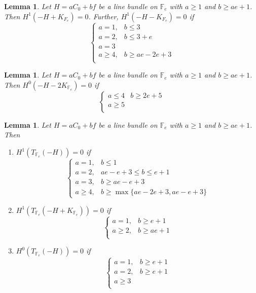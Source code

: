 \documentclass[11pt,twoside]{amsart}
\theoremstyle{plain}
\numberwithin{equation}{section}
\newtheorem{lemma}[theorem]{Lemma}
\theoremstyle{definition}
\begin{document}
\begin{lemma}\label{-H-K_Y}
Let $H = aC_0+bf$ be a line bundle on $\mathbb{F}_e$ with $a \geq 1$ and $b \geq ae+1$. Then $H^1(-H+K_{F_e}) = 0$. Further, $H^1(-H-K_{F_e}) = 0$ if 
 \[
\begin{cases}
   a = 1, & b \leq 3  \\
   a = 2, & b \leq 3+e \\
   a = 3 & \\
   a \geq 4, & b \geq ae-2e+3 \\
\end{cases}
 \]

\end{lemma}



\begin{lemma}\label{-H-2K_Y}
Let $H = aC_0+bf$ be a line bundle on $\mathbb{F}_e$ with $a \geq 1$ and $b \geq ae+1$. Then $H^0(-H-2K_{\mathbb{F}_e}) = 0$ if 
\[
\begin{cases}
   a \leq 4 & b \geq 2e+5  \\
   a \geq 5 &   \\
   
\end{cases}
\]
    
\end{lemma}

\begin{lemma}\label{T_Y(-H)}
Let $H = aC_0+bf$ be a line bundle on $\mathbb{F}_e$ with $a \geq 1$ and $b \geq ae+1$. Then 
\begin{enumerate}
    \item[(1)] $H^1(T_{\mathbb{F}_e}(-H)) = 0$ if 
\[
\begin{cases}
   a = 1, & b \leq 1  \\
   a = 2, & ae-e+3 \leq b \leq e+1  \\
   a = 3, & b \geq ae-e+3 \\
   a \geq 4, & b \geq \operatorname{max}\{ae-2e+3, ae-e+3\}
   
\end{cases}
\]

  \item[(2)] $H^1(T_{\mathbb{F}_e}(-H+K_{\mathbb{F}_e})) = 0$ if 
\[
\begin{cases}
   a = 1, & b \geq e+1  \\
   a \geq 2, & b \geq ae+1 \\
\end{cases}
\] 

\item[(3)] $H^0(T_{\mathbb{F}_e}(-H)) = 0$ if 
\[
\begin{cases}
   a = 1, & b \geq e+1  \\
   a = 2, & b \geq e+1 \\
   a \geq 3 & \\
\end{cases}
\] 

\end{enumerate}

\end{lemma}
\end{document}
